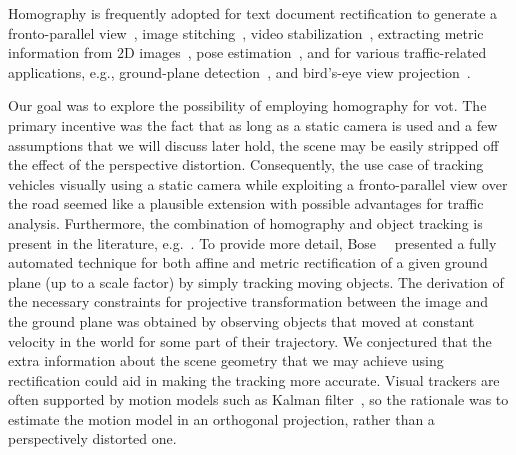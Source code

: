 Homography is frequently adopted for text document rectification to generate a fronto-parallel view~\cite{lu2005perspective, miao2006perspective}, image stitching~\cite{adel2014image, gao2011constructing}, video stabilization~\cite{liu2015smooth}, extracting metric information from $2$D images~\cite{zhang2000flexible}, pose estimation~\cite{mariyanayagam2018poseestim}, and for various traffic-related applications, e.g., ground-plane detection~\cite{arrospide2010homography}, and bird's-eye view projection~\cite{luo2010low}.

Our goal was to explore the possibility of employing homography for \gls{vot}. The primary incentive was the fact that as long as a static camera is used and a few assumptions that we will discuss later hold, the scene may be easily stripped off the effect of the perspective distortion. Consequently, the use case of tracking vehicles visually using a static camera while exploiting a fronto-parallel view over the road seemed like a plausible extension with possible advantages for traffic analysis. Furthermore, the combination of homography and object tracking is present in the literature, e.g.~\cite{bose2004groundplane, zhang2012homographytrack, Mei2009}. To provide more detail, Bose~\etal{}~\cite{bose2004groundplane} presented a fully automated technique for both affine and metric rectification of a given ground plane (up to a scale factor) by simply tracking moving objects. The derivation of the necessary constraints for projective transformation between the image and the ground plane was obtained by observing objects that moved at constant velocity in the world for some part of their trajectory. We conjectured that the extra information about the scene geometry that we may achieve using rectification could aid in making the tracking more accurate. Visual trackers are often supported by motion models such as Kalman filter~\cite{kalman1960linearfilter}, so the rationale was to estimate the motion model in an orthogonal projection, rather than a perspectively distorted one.


